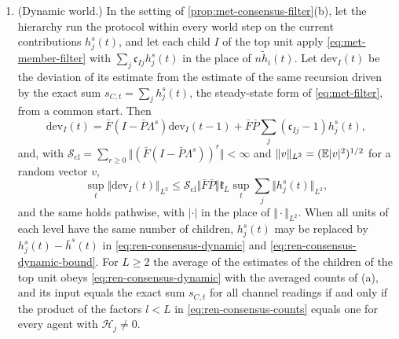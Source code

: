\begin{proposition}
\begin{enumerate}
\begin{equation}
\KL\bigl(q_I\Vert p^\ast\bigr)\le\frac{\mathfrak k_L^2}{(1-\mathfrak k_L)^2}\Bigl[\frac{\dim\eta_C}4+\frac12\Bigl(\sum_j\bigl\Vert h^s_j-\Lambda^s_jm^\ast\bigr\Vert_{(\Lambda^\ast)^{-1}}\Bigr)^2\Bigr].
\end{equation}
\item[(d)] (Dynamic world.) In the setting of \cref{prop:met-consensus-filter}(b), let the hierarchy run the protocol within every world step on the current contributions $h^s_j(t)$, and let each child $I$ of the top unit apply \eqref{eq:met-member-filter} with $\sum_j\mathfrak c_{Ij}h^s_j(t)$ in the place of $n\tilde h_i(t)$. Let $\mathrm{dev}_I(t)$ be the deviation of its estimate from the estimate of the same recursion driven by the exact sum $s_{C,t}=\sum_jh^s_j(t)$, the steady-state form of \eqref{eq:met-filter}, from a common start. Then
\begin{equation}\label{eq:ren-consensus-dynamic}
\mathrm{dev}_I(t)=\bar F(I-\bar P\Lambda^s)\mathrm{dev}_I(t-1)+\bar F\bar P\sum_j(\mathfrak c_{Ij}-1)h^s_j(t),
\end{equation}
and, with $\mathcal S_{\mathrm{cl}}=\sum_{r\ge0}\Vert(\bar F(I-\bar P\Lambda^s))^r\Vert<\infty$ and $\Vert v\Vert_{L^2}=(\mathbb{E}\lvert v\rvert^2)^{1/2}$ for a random vector $v$,
\begin{equation}\label{eq:ren-consensus-dynamic-bound}
\sup_t\Vert\mathrm{dev}_I(t)\Vert_{L^2}\le\mathcal S_{\mathrm{cl}}\Vert\bar F\bar P\Vert\mathfrak k_L\sup_t\sum_j\Vert h^s_j(t)\Vert_{L^2},
\end{equation}
and the same holds pathwise, with $\lvert\cdot\rvert$ in the place of $\Vert\cdot\Vert_{L^2}$. When all units of each level have the same number of children, $h^s_j(t)$ may be replaced by $h^s_j(t)-\bar h^s(t)$ in \eqref{eq:ren-consensus-dynamic} and \eqref{eq:ren-consensus-dynamic-bound}. For $L\ge2$ the average of the estimates of the children of the top unit obeys \eqref{eq:ren-consensus-dynamic} with the averaged counts of (a), and its input equals the exact sum $s_{C,t}$ for all channel readings if and only if the product of the factors $l<L$ in \eqref{eq:ren-consensus-counts} equals one for every agent with $\mathcal H_j\ne0$.
\end{enumerate}
\end{proposition}
